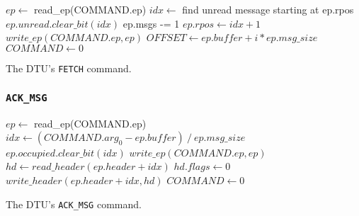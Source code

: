 \documentclass[a4paper,11pt,draft]{article}
\begin{document}
\begin{algorithm}[H]
    $ep \gets$ read\_ep(COMMAND.ep)\;
    \BlankLine
    $idx \gets$ find unread message starting at ep.rpos\;
    $ep.unread.clear\_bit(idx)$\;
    ep.msgs -= 1\;
    $ep.rpos \gets idx + 1$\;
    $write\_ep(COMMAND.ep, ep)$\;
    \BlankLine
    $OFFSET \gets ep.buffer + i * ep.msg\_size$\;
    $COMMAND \gets 0$\;
    \caption{The DTU's \texttt{FETCH} command.}
\end{algorithm}

\subsubsection{\texttt{ACK\_MSG}}

\begin{algorithm}[H]
    $ep \gets$ read\_ep(COMMAND.ep)\;
    \BlankLine
    $idx \gets (COMMAND.arg_0 - ep.buffer)\ /\ ep.msg\_size$\;
    $ep.occupied.clear\_bit(idx)$\;
    $write\_ep(COMMAND.ep, ep)$\;
    \BlankLine
    $hd \gets read\_header(ep.header + idx)$\;
    $hd.flags \gets 0$\;
    $write\_header(ep.header + idx, hd)$\;
    \BlankLine
    $COMMAND \gets 0$\;
    \caption{The DTU's \texttt{ACK\_MSG} command.}
\end{algorithm}
\end{document}
